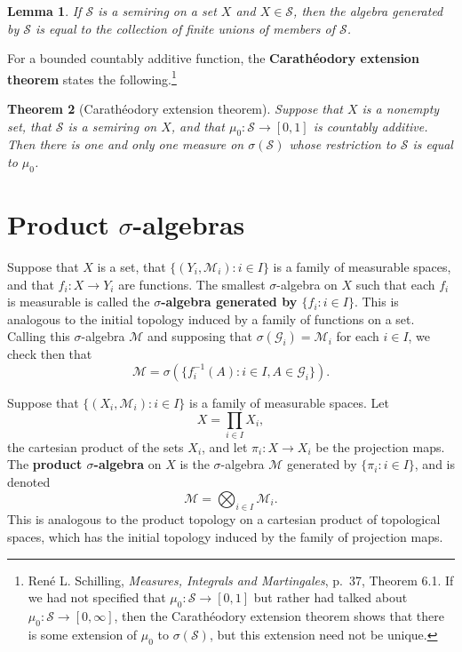\documentclass{article}
\newtheorem{theorem}{Theorem}
\newtheorem{lemma}[theorem]{Lemma}
\theoremstyle{definition}
\begin{document}
\begin{lemma}
\label{semiringgen}
If $\mathscr{S}$ is a semiring on a set $X$ and $X \in \mathscr{S}$, then the algebra generated by
$\mathscr{S}$ is equal to the collection of finite unions of members of $\mathscr{S}$. 
\end{lemma}

For a bounded countably additive function, the \textbf{Carath\'eodory extension theorem} states the following.\footnote{Ren\'e L. Schilling,
{\em Measures, Integrals and Martingales}, p.~37, Theorem 6.1. If we had not specified that $\mu_0:\mathscr{S} \to [0,1]$ but rather had
talked about $\mu_0:\mathscr{S} \to [0,\infty]$, then the Carath\'eodory extension theorem shows that there is some extension of
$\mu_0$ to $\sigma(\mathscr{S})$, but  this extension need not be unique.}

\begin{theorem}[Carath\'eodory extension theorem]
Suppose that $X$ is a nonempty set, that $\mathscr{S}$ is a semiring on $X$, and that $\mu_0:\mathscr{S} \to [0,1]$ is countably
additive. Then there is one and only one measure on $\sigma(\mathscr{S})$ whose restriction to $\mathscr{S}$ is equal to $\mu_0$.
\end{theorem}



\section{Product $\sigma$-algebras}
\label{productsection}
Suppose that $X$ is a set, that
$\{(Y_i,\mathscr{M}_i): i \in I\}$ is a family of measurable spaces,  and that $f_i:X \to Y_i$ are functions.
The smallest $\sigma$-algebra on $X$ such that each $f_i$ is measurable is called the \textbf{$\sigma$-algebra generated by
$\{f_i:i \in I\}$}.
This is analogous to the initial topology induced by a family of functions on a
set.
Calling this $\sigma$-algebra $\mathscr{M}$ and
 supposing that 
 $\sigma(\mathscr{G}_i)=\mathscr{M}_i$ for each $i \in I$, we check then that
\begin{equation}
\mathscr{M} = \sigma\left( \{f_i^{-1}(A): i \in I, A \in \mathscr{G}_i\} \right).
\label{initialgen}
\end{equation}

Suppose that $\{(X_i,\mathscr{M}_i): i \in I\}$  is a family of measurable spaces.  Let
\[
X=\prod_{i \in I} X_i,
\]
 the cartesian product of the sets $X_i$, and let $\pi_i:X \to X_i$ be the projection maps. The \textbf{product $\sigma$-algebra} on
$X$ is the $\sigma$-algebra $\mathscr{M}$ generated by $\{\pi_i: i \in I\}$, and is denoted
\[
\mathscr{M}=\bigotimes_{i \in I} \mathscr{M}_i.
\]
This is analogous to the product topology on a cartesian product of topological spaces, which has the initial topology induced by the 
family of projection maps. 
\end{document}
